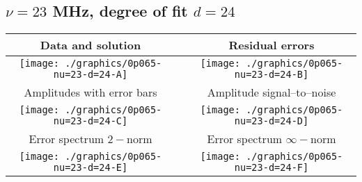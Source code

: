 

% 

\clearpage{}
\break{}

\subsection{$\nu = 23$ MHz, degree of fit $d = 24$}

\begin{table}[h]
    \begin{center}
        \begin{tabular}{ccc}
            Data and solution & \quad & Residual errors \\\hline
            \texttt{[image: ./graphics/0p065-nu=23-d=24-A]} &&
            \texttt{[image: ./graphics/0p065-nu=23-d=24-B]} \\[15pt]
            Amplitudes with error bars && Amplitude signal--to--noise \\\hline
            \texttt{[image: ./graphics/0p065-nu=23-d=24-C]} &&
            \texttt{[image: ./graphics/0p065-nu=23-d=24-D]} \\[15pt]
            Error spectrum $2-$norm && Error spectrum $\infty-$norm \\\hline
            \texttt{[image: ./graphics/0p065-nu=23-d=24-E]} &&
            \texttt{[image: ./graphics/0p065-nu=23-d=24-F]} \\[15pt]
        \end{tabular}
    \end{center}
\label{fig:elev=65, nu=23}
\end{table}



\endinput
